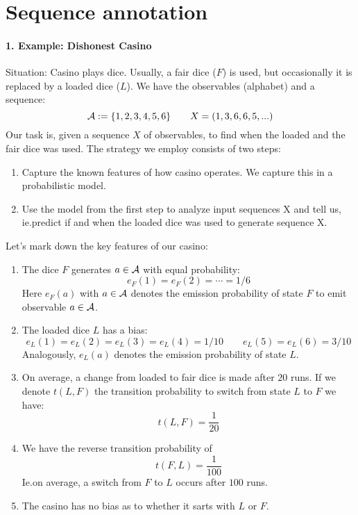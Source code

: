 





\section{Sequence annotation}

\paragraph{1. Example: Dishonest Casino}
Situation: Casino plays dice.  Usually, a fair dice (\(F\)) is used, but
occasionally it is replaced by a loaded dice (\(L\)).  We have the observables
(alphabet) and a sequence:
\[
    \mathcal{A} := \{ 1, 2, 3, 4, 5, 6 \} \qquad
    X = (1,3,6,6,5,...)
\]
Our task is, given a sequence \(X\) of observables, to find when the loaded and
the fair dice was used. The strategy we employ consists of two steps:
\begin{enumerate}[label=\arabic*.]
\item Capture the known features of how casino operates.  We capture this in
 a probabilistic model.
\item Use the model from the first step to analyze input sequences X and tell
 us, ie.\@ predict if and when the loaded dice was used to generate sequence
 X.
\end{enumerate}

Let's mark down the key features of our casino:
\begin{enumerate}[label=(\alph*)]
\item The dice \(F\) generates \(a\in\mathcal{A}\) with equal probability:
 \[
   e_F(1) = e_F(2) = \dotsb = 1/6
 \]
 Here \(e_F(a)\) with \(a\in\mathcal{A}\) denotes the emission probability
 of state \(F\) to emit observable \(a\in\mathcal{A}\).
\item The loaded dice \(L\) has a bias:
 \[
   e_L(1) = e_L(2) = e_L(3) = e_L(4) = 1/10 \qquad e_L(5) = e_L(6) = 3/10
 \]
 Analogously, \(e_L(a)\) denotes the emission probability of state \(L\).
 \item On average, a change from loaded to fair dice is made after \(20\)
 runs.  If we denote \(t(L,F)\) the transition probability to switch from state
 \(L\) to \(F\) we have:
 \[
   t(L,F) = \frac{1}{20}
 \]
 \item We have the reverse transition probability of
 \[
   t(F,L) = \frac{1}{100}
 \]
 Ie.\@ on average, a switch from \(F\) to \(L\) occurs after \(100\) runs.
 \item The casino has no bias as to whether it sarts with \(L\) or \(F\).
\end{enumerate}


